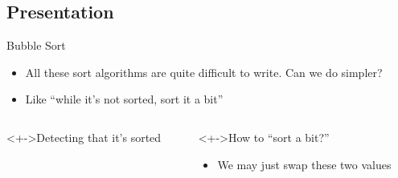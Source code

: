 \subsection{Presentation}
\begin{frame}{Bubble Sort}
  \begin{itemize}
  \item All these sort algorithms are quite difficult to write. Can we do simpler?
  \item<+-> Like ``while it's not sorted, sort it a bit''
  \end{itemize}

  \begin{columns}
    \begin{column}{.5\linewidth}
      \begin{block}<+->{Detecting that it's sorted}\medskip
      \end{block}
    \end{column}

    \begin{column}{.5\linewidth}
      \begin{block}<+->{How to ``sort a bit?''}
        \begin{itemize}
        \item We may just swap these two values
        \end{itemize}
        \centerline{}
      \end{block}
    \end{column}
  \end{columns}
  \bigskip


\end{frame}
